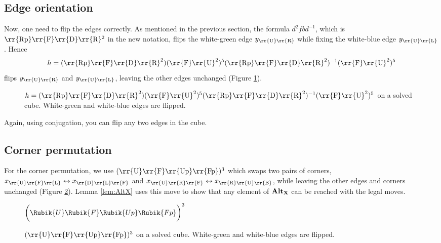 \subsection{Edge orientation}

Now, one need to flip the edges correctly.
As mentioned in the previous section, the formula $d^2 f b d^{-1}$, which is $\text{\rr{Rp}\rr{F}\rr{D}\rr{R}}{}^{2}$ in the new notation, flips the white-green edge $y_{\text{\rr{U}\rr{R}}}$ while fixing the white-blue edge $y_{\text{\rr{U}\rr{L}}}$.
Hence
\[
h = (\text{\rr{Rp}\rr{F}\rr{D}\rr{R}}^{2}) (\text{\rr{F}\rr{U}}^{2})^{5} (\text{\rr{Rp}\rr{F}\rr{D}\rr{R}}^{2})^{-1}(\text{\rr{F}\rr{U}}^{2})^{5}
\]
flips $y_{\text{\rr{U}\rr{R}}}$ and $y_{\text{\rr{U}\rr{L}}}$, leaving the other edges unchanged (Figure \ref{fig:flip-edge}).

\begin{figure}[hbt]
    \centering%
    \RubikCubeSolvedWY%
    \caption{$h = (\text{\rr{Rp}\rr{F}\rr{D}\rr{R}}^{2}) (\text{\rr{F}\rr{U}}^{2})^{5} (\text{\rr{Rp}\rr{F}\rr{D}\rr{R}}^{2})^{-1}(\text{\rr{F}\rr{U}}^{2})^{5}$ on a solved cube. White-green and white-blue edges are flipped.}
    \label{fig:flip-edge}
\end{figure}

Again, using conjugation, you can flip any two edges in the cube.

\subsection{Corner permutation}

For the corner permutation, we use $(\text{\rr{U}\rr{F}\rr{Up}\rr{Fp}})^{3}$ which swaps two pairs of corners, $x_{\text{\rr{U}\rr{F}\rr{L}}} \leftrightarrow x_{\text{\rr{D}\rr{L}\rr{F}}}$ and $x_{\text{\rr{U}\rr{R}\rr{F}}} \leftrightarrow x_{\text{\rr{R}\rr{U}\rr{B}}}$, while leaving the other edges and corners unchanged (Figure \ref{fig:swap-corners}).
Lemma \ref{lem:AltX} uses this move to show that any element of $\mathbf{Alt}_{\mathbf{X}}$ can be reached with the legal moves.

\begin{figure}[hbt]
    \centering%
    \RubikCubeSolvedWY%
    $\bigg(\Rubik{U}\Rubik{F}\Rubik{Up}\Rubik{Fp}\bigg)^{3}$
    \caption{$(\text{\rr{U}\rr{F}\rr{Up}\rr{Fp}})^{3}$ on a solved cube. White-green and white-blue edges are flipped.}
    \label{fig:swap-corners}
\end{figure}

